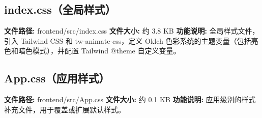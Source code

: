 \documentclass[code]{mancls}
\begin{document}
\pagebreak

\subsection{index.css（全局样式）}
\textbf{文件路径:} frontend/src/index.css
\textbf{文件大小:} 约 3.8 KB
\textbf{功能说明:} 全局样式文件，引入 Tailwind CSS 和 tw-animate-css，定义 Oklch 色彩系统的主题变量（包括亮色和暗色模式），并配置 Tailwind @theme 自定义变量。



\pagebreak

\subsection{App.css（应用样式）}
\textbf{文件路径:} frontend/src/App.css
\textbf{文件大小:} 约 0.1 KB
\textbf{功能说明:} 应用级别的样式补充文件，用于覆盖或扩展默认样式。


\end{document}
